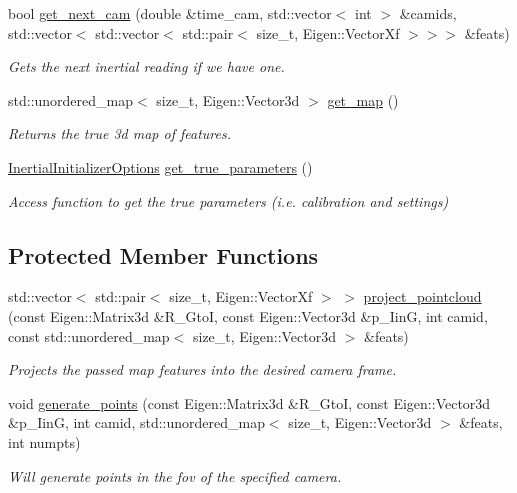 \begin{DoxyCompactItemize}
bool \hyperlink{classov__init_1_1SimulatorInit_a3101f4237fc14a77d8d4b6de038bd323}{get\+\_\+next\+\_\+cam} (double \&time\+\_\+cam, std\+::vector$<$ int $>$ \&camids, std\+::vector$<$ std\+::vector$<$ std\+::pair$<$ size\+\_\+t, Eigen\+::\+Vector\+Xf $>$$>$$>$ \&feats)
\begin{DoxyCompactList}\small\item\em Gets the next inertial reading if we have one. \end{DoxyCompactList}\item 
\mbox{\label{classov__init_1_1SimulatorInit_ac7b4f53f1aa8775c636976cb912cad64}} 
std\+::unordered\+\_\+map$<$ size\+\_\+t, Eigen\+::\+Vector3d $>$ \hyperlink{classov__init_1_1SimulatorInit_ac7b4f53f1aa8775c636976cb912cad64}{get\+\_\+map} ()
\begin{DoxyCompactList}\small\item\em Returns the true 3d map of features. \end{DoxyCompactList}\item 
\mbox{\label{classov__init_1_1SimulatorInit_a1c311cdb3c5de359ca6a8080fda13de6}} 
\hyperlink{structov__init_1_1InertialInitializerOptions}{Inertial\+Initializer\+Options} \hyperlink{classov__init_1_1SimulatorInit_a1c311cdb3c5de359ca6a8080fda13de6}{get\+\_\+true\+\_\+parameters} ()
\begin{DoxyCompactList}\small\item\em Access function to get the true parameters (i.\+e. calibration and settings) \end{DoxyCompactList}\end{DoxyCompactItemize}
\subsection*{Protected Member Functions}
\begin{DoxyCompactItemize}
\item 
std\+::vector$<$ std\+::pair$<$ size\+\_\+t, Eigen\+::\+Vector\+Xf $>$ $>$ \hyperlink{classov__init_1_1SimulatorInit_a97c74693a9fe77d025d53983c9a147ce}{project\+\_\+pointcloud} (const Eigen\+::\+Matrix3d \&R\+\_\+\+GtoI, const Eigen\+::\+Vector3d \&p\+\_\+\+IinG, int camid, const std\+::unordered\+\_\+map$<$ size\+\_\+t, Eigen\+::\+Vector3d $>$ \&feats)
\begin{DoxyCompactList}\small\item\em Projects the passed map features into the desired camera frame. \end{DoxyCompactList}\item 
void \hyperlink{classov__init_1_1SimulatorInit_a352ee444f38cb6689e37ac83e30c7a68}{generate\+\_\+points} (const Eigen\+::\+Matrix3d \&R\+\_\+\+GtoI, const Eigen\+::\+Vector3d \&p\+\_\+\+IinG, int camid, std\+::unordered\+\_\+map$<$ size\+\_\+t, Eigen\+::\+Vector3d $>$ \&feats, int numpts)
\begin{DoxyCompactList}\small\item\em Will generate points in the fov of the specified camera. \end{DoxyCompactList}\end{DoxyCompactItemize}
